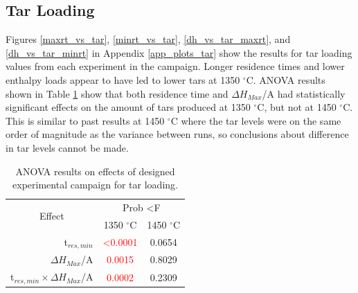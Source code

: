 \documentclass[11pt,twocolumn]{article}
\begin{document}

\subsection*{Tar Loading}

Figures \ref{maxrt_vs_tar}, \ref{minrt_vs_tar}, \ref{dh_vs_tar_maxrt}, and \ref{dh_vs_tar_minrt} in Appendix \ref{app_plots_tar} show the results for tar loading values from each experiment in the campaign.  Longer residence times and lower enthalpy loads appear to have led to lower tars at 1350 $^\circ$C.  ANOVA results shown in Table \ref{anova_tar} show that both residence time and $\Delta H_{Max}$/A had statistically significant effects on the amount of tars produced at 1350 $^\circ$C, but not at 1450 $^\circ$C.  This is similar to past results at 1450 $^\circ$C where the tar levels were on the same order of magnitude as the variance between runs, so conclusions about difference in tar levels cannot be made.

\begin{table}
	\centering
	\caption{ANOVA results on effects of designed experimental campaign for tar loading.}
	\begin{tabular}{r c c}
		\toprule
		\multicolumn{1}{c}{\multirow{2}{*}{Effect}}		& 	\multicolumn{2}{c}{Prob \textless F	}	\\
		{}								&	1350 $^\circ$C	&	1450 $^\circ$C			\\
		\midrule
		t$_{res,min}$						&	\textcolor{red}{\textless 0.0001}	&	0.0654			\\
		$\Delta H_{Max}$/A					&	\textcolor{red}{0.0015}			&	0.8029			\\
		t$_{res,min}\times \Delta H_{Max}$/A	&	\textcolor{red}{0.0002}			&	0.2309			\\
		\bottomrule
	\end{tabular}
	\label{anova_tar}
\end{table}
\end{document}

